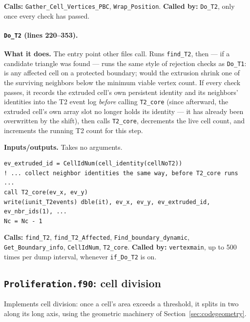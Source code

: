 \documentclass[11pt]{article}
\begin{document}
\textbf{Calls:} \texttt{Gather\_Cell\_Vertices\_PBC}, \texttt{Wrap\_Position}.
\textbf{Called by:} \texttt{Do\_T2}, only once every check has passed.

\paragraph{\texttt{Do\_T2} (lines 220--353).}
\textbf{What it does.} The entry point other files call. Runs \texttt{find\_T2}, then
--- if a candidate triangle was found --- runs the same style of rejection checks as
\texttt{Do\_T1}: is any affected cell on a protected boundary; would the extrusion
shrink one of the surviving neighbors below the minimum viable vertex count. If every
check passes, it records the extruded cell's own persistent identity and its
neighbors' identities into the T2 event log \emph{before} calling \texttt{T2\_core}
(since afterward, the extruded cell's own array slot no longer holds its identity ---
it has already been overwritten by the shift), then calls \texttt{T2\_core}, decrements
the live cell count, and increments the running T2 count for this step.

\textbf{Inputs/outputs.} Takes no arguments.

\begin{lstlisting}[caption={Capturing identities before the shift erases them, and finalizing the extrusion, in \texttt{Do\_T2}.}]
ev_extruded_id = CellIdNum(cell_identity(cellNoT2))
! ... collect neighbor identities the same way, before T2_core runs ...
call T2_core(ev_x, ev_y)
write(iunit_T2events) dble(it), ev_x, ev_y, ev_extruded_id, ev_nbr_ids(1), ...
Nc = Nc - 1
\end{lstlisting}

\textbf{Calls:} \texttt{find\_T2}, \texttt{find\_T2\_Affected},
\texttt{Find\_boundary\_dynamic}, \texttt{Get\_Boundary\_info}, \texttt{CellIdNum},
\texttt{T2\_core}. \textbf{Called by:} \texttt{vertexmain}, up to 500 times per dump
interval, whenever \texttt{if\_Do\_T2} is on.
\subsection{\texttt{Proliferation.f90}: cell division}
\label{sec:codeprolif}

Implements cell division: once a cell's area exceeds a threshold, it splits in two
along its long axis, using the geometric machinery of Section~\ref{sec:codegeometry}.
\end{document}
